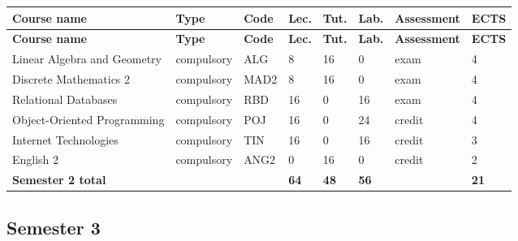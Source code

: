 \documentclass[12pt,a4paper]{article}
\newcommand{\thdrule}{\noalign{\global\setlength{\extrarowheight}{0pt}}}
\newcommand{\thdend}{\noalign{\global\setlength{\extrarowheight}{4pt}}}
\begin{document}
{\scriptsize
\begin{longtable}{m{5.0cm}m{1.9cm}m{0.75cm}m{0.85cm}m{0.85cm}m{0.85cm}m{1.45cm}m{0.9cm}}
\thdrule\toprule
\rowcolor{pjatkRed}
{\color{white}\footnotesize\textbf{\vphantom{Ag}Course name}} & {\color{white}\footnotesize\textbf{\vphantom{Ag}Type}} & {\color{white}\footnotesize\textbf{\vphantom{Ag}Code}} & {\color{white}\footnotesize\textbf{\vphantom{Ag}Lec.}} & {\color{white}\footnotesize\textbf{\vphantom{Ag}Tut.}} & {\color{white}\footnotesize\textbf{\vphantom{Ag}Lab.}} & {\color{white}\footnotesize\textbf{\vphantom{Ag}Assessment}} & {\color{white}\footnotesize\textbf{\vphantom{Ag}ECTS}} \\
\midrule\thdend
\endfirsthead
\thdrule\toprule
\rowcolor{pjatkRed}
{\color{white}\footnotesize\textbf{\vphantom{Ag}Course name}} & {\color{white}\footnotesize\textbf{\vphantom{Ag}Type}} & {\color{white}\footnotesize\textbf{\vphantom{Ag}Code}} & {\color{white}\footnotesize\textbf{\vphantom{Ag}Lec.}} & {\color{white}\footnotesize\textbf{\vphantom{Ag}Tut.}} & {\color{white}\footnotesize\textbf{\vphantom{Ag}Lab.}} & {\color{white}\footnotesize\textbf{\vphantom{Ag}Assessment}} & {\color{white}\footnotesize\textbf{\vphantom{Ag}ECTS}} \\
\midrule\thdend
\endhead
\rowcolor{tableRowLight} Linear Algebra and Geometry & {\scriptsize compulsory} & ALG & 8 & 16 & 0 & {\scriptsize exam} & 4 \\
\rowcolor{tableRowAlt} Discrete Mathematics 2 & {\scriptsize compulsory} & MAD2 & 8 & 16 & 0 & {\scriptsize exam} & 4 \\
\rowcolor{tableRowLight} Relational Databases & {\scriptsize compulsory} & RBD & 16 & 0 & 16 & {\scriptsize exam} & 4 \\
\rowcolor{tableRowAlt} Object-Oriented Programming & {\scriptsize compulsory} & POJ & 16 & 0 & 24 & {\scriptsize credit} & 4 \\
\rowcolor{tableRowLight} Internet Technologies & {\scriptsize compulsory} & TIN & 16 & 0 & 16 & {\scriptsize credit} & 3 \\
\rowcolor{tableRowAlt} English 2 & {\scriptsize compulsory} & ANG2 & 0 & 16 & 0 & {\scriptsize credit} & 2 \\
\midrule[\heavyrulewidth]
\rowcolor{tableSummary} \textbf{Semester 2 total} & & & \textbf{64} & \textbf{48} & \textbf{56} & & \textbf{21} \\
\bottomrule
\end{longtable}}

\subsection*{Semester 3}
\end{document}
